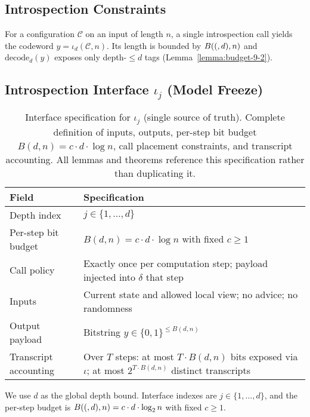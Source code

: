   \subsection{Introspection Constraints}
  
  \begin{definition}
  For a configuration $\mathcal{C}$ on an input of length $n$, a single introspection call yields the codeword $y=\iota_d(\mathcal{C},n)$. Its length is bounded by $B((,d),n)$ and $\mathrm{decode}_d(y)$ exposes only depth-$\le d$ tags (Lemma~\ref{lemma:budget-9-2}).
  \end{definition}
  
\subsection{Introspection Interface \texorpdfstring{$\iota_j$}{iota-j} (Model Freeze)}
\label{sec:model-freeze}
  
  \begin{table}[t]
  \centering
\caption{Interface specification for $\iota_j$ (single source of truth). Complete definition of inputs, outputs, per-step bit budget $B(d,n) = c \cdot d \cdot \log n$, call placement constraints, and transcript accounting. All lemmas and theorems reference this specification rather than duplicating it.}
  \label{tab:iota-spec}
  \small  %
  \begin{tabular}{@{}p{3.5cm}p{10cm}@{}}  %
  \toprule
  Field & Specification \\
  \midrule
  Depth index & $j \in \{1,\ldots,d\}$ \\
  Per-step bit budget & $B(d,n) = c \cdot d \cdot \log n$ with fixed $c \ge 1$ \\
  Call policy & Exactly once per computation step; payload injected into $\delta$ that step \\
  Inputs & Current state and allowed local view; no advice; no randomness \\
  Output payload & Bitstring $y \in \{0,1\}^{\le B(d,n)}$ \\
  Transcript accounting & Over $T$ steps: at most $T \cdot B(d,n)$ bits exposed via $\iota$; at most $2^{T \cdot B(d,n)}$ distinct transcripts \\
  \bottomrule
  \end{tabular}
\end{table}
  
  \begin{remark}\label{rem:depth-notation}
We use $d$ as the global depth bound. Interface indexes are $j\in\{1,\dots,d\}$, and the per-step budget is $\B(d,n)=c\cdot d\cdot \log n$ with fixed $c\ge 1$.
  \end{remark}
  

